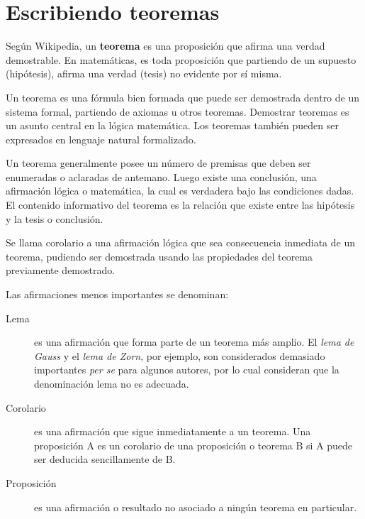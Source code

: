 \documentclass[11pt,a4paper]{report}
\begin{document}
\chapter{Escribiendo teoremas}





Según Wikipedia, un \textbf{teorema} es una proposición que afirma una verdad demostrable. 
En matemáticas, es toda proposición que partiendo de un supuesto (hipótesis), afirma una verdad (tesis) no evidente por sí misma.

Un teorema es una fórmula bien formada que puede ser demostrada dentro de un sistema formal, partiendo de axiomas u otros teoremas. Demostrar teoremas es un asunto central en la lógica matemática. 
Los teoremas también pueden ser expresados en lenguaje natural formalizado.

Un teorema generalmente posee un número de premisas que deben ser enumeradas o aclaradas de antemano. Luego existe una conclusión, una afirmación lógica o matemática, la cual es verdadera bajo las condiciones dadas. El contenido informativo del teorema es la relación que existe entre las hipótesis y la tesis o conclusión.

Se llama corolario a una afirmación lógica que sea consecuencia inmediata de un teorema, pudiendo ser demostrada usando las propiedades del teorema previamente demostrado.



Las afirmaciones menos importantes se denominan:

\begin{description}
%
\item[Lema] 
es una afirmación que forma parte de un teorema más amplio. El \emph{lema de Gauss} y el \emph{lema de Zorn}, por ejemplo, son considerados demasiado importantes \emph{per se} para algunos autores, por lo cual consideran que la denominación lema no es adecuada.

%
\item[Corolario] 
es una afirmación que sigue inmediatamente a un teorema. Una proposición A es un corolario de una proposición o teorema B si A puede ser deducida sencillamente de B.

%
\item[Proposición] 
es una afirmación o resultado no asociado a ningún teorema en particular.


%
\end{description}
\end{document}
